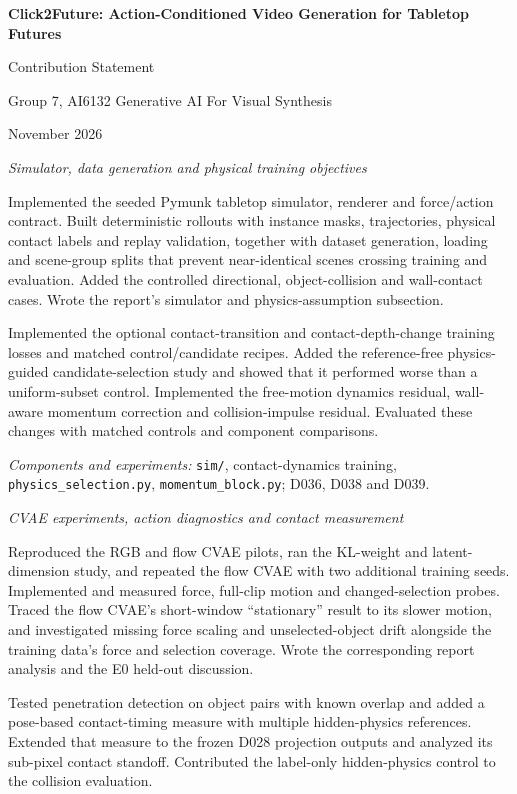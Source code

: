 \documentclass[11pt,a4paper]{article}
\newcommand{\member}[2]{%
  \par\addvspace{13pt}{\bfseries\fontsize{13.2}{16}\selectfont #1}\par\nobreak
  {\itshape #2}\par\nobreak\vspace{2pt}}
\newcommand{\evidence}[1]{\par{\fontsize{9.5}{12}\selectfont\textit{Components and experiments:} #1\par}}
\begin{document}
\thispagestyle{plain}
\begin{center}
{\bfseries\fontsize{18}{22}\selectfont
Click2Future: Action-Conditioned Video Generation for Tabletop Futures\par}
\vspace{8pt}
{\large Contribution Statement\par}
\vspace{4pt}
Group 7, AI6132 Generative AI For Visual Synthesis\par
{\fontsize{9}{11} November 2026\par}
\end{center}

\member{PRAMOD SANJAY}{Simulator, data generation and physical training objectives}
Implemented the seeded Pymunk tabletop simulator, renderer and force/action
contract. Built deterministic rollouts with instance masks, trajectories,
physical contact labels and replay validation, together with dataset generation,
loading and scene-group splits that prevent near-identical scenes crossing
training and evaluation. Added the controlled directional, object-collision and
wall-contact cases. Wrote the report's simulator and
physics-assumption subsection.

Implemented the optional contact-transition and contact-depth-change training
losses and matched control/candidate recipes. Added the reference-free
physics-guided candidate-selection study and showed that it performed worse
than a uniform-subset control. Implemented the free-motion dynamics
residual, wall-aware momentum correction and collision-impulse residual.
Evaluated these changes with matched controls and component comparisons.

\evidence{\texttt{sim/}, contact-dynamics training,
\texttt{physics\_selection.py}, \texttt{momentum\_block.py}; D036, D038 and D039.}

\member{KAPOOR ANANYA}{CVAE experiments, action diagnostics and contact measurement}
Reproduced the RGB and flow CVAE pilots, ran the
KL-weight and latent-dimension study, and repeated the flow CVAE with two
additional training seeds. Implemented and measured force, full-clip motion
and changed-selection probes. Traced the flow CVAE's short-window ``stationary''
result to its slower motion, and investigated missing force scaling and
unselected-object drift alongside the training data's force and selection
coverage. Wrote the corresponding report analysis and the E0 held-out discussion.

Tested penetration detection on object pairs with known overlap and added a
pose-based contact-timing measure with multiple hidden-physics references.
Extended that measure to the frozen D028 projection outputs and analyzed its
sub-pixel contact standoff. Contributed the label-only hidden-physics control
to the collision evaluation.
\end{document}

